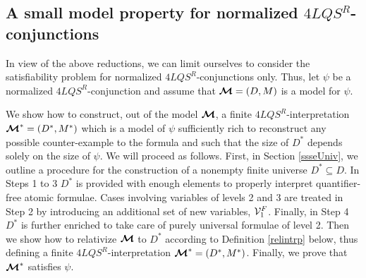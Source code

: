 \documentclass{fundam}
\newcommand{\model}{\ensuremath{\mbox{\boldmath $\mathcal{M}$}}\xspace}
\newcommand{\QLQSR}{\ensuremath{\mbox{$4\mathit{LQS}^{R}$}}\xspace}
\begin{document}
\subsection{A small model property for normalized $\QLQSR$-conjunctions}
\label{decisionproc}
In view of the above reductions, we can limit ourselves to consider
the satisfiability problem for normalized $\QLQSR$-conjunctions only.
Thus, let $\psi$ be a normalized $\QLQSR$-conjunction and assume that
$\model = (D, M)$ is a model for $\psi$.

We show how to construct, out of the model $\model$, a finite
$\QLQSR$-interpretation $\model^* = (D^*,M^*)$ which is a model of
$\psi$ sufficiently rich to reconstruct any possible counter-example to the formula and
such that the size of $D^*$ depends solely on the size of
$\psi$.  We will proceed as follows.  First, in Section \ref{ssseUniv}, we outline a procedure for
the construction of a nonempty finite universe $D^* \subseteq D$. In Steps 1 to 3 $D^*$
is provided with enough elements to properly interpret quantifier-free atomic formulae. Cases involving
variables of levels 2 and 3 are treated in Step 2 by introducing an additional set of new variables, ${\cal V}_{1}^{F}$.
Finally, in Step 4 $D^*$ is further enriched to take care of purely universal formulae of level 2.
Then we show how to relativize $\model$ to $D^*$ according to
Definition \ref{relintrp} below, thus defining a finite
$\QLQSR$-interpretation $\model^* = (D^*,M^*)$.  Finally, we prove
that $\model^*$ satisfies $\psi$.
\end{document}
